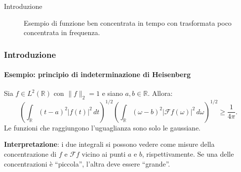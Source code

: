 \documentclass[aspectratio=141]{beamer}
\newcommand{\R}{\mathbb{R}} %
\newcommand{\F}{\mathscr{F}} %
\begin{document}
\begin{section}{Introduzione}
\begin{frame}
\begin{center}
\begin{figure}
{}
			\caption{Esempio di funzione ben concentrata in tempo con trasformata poco concentrata in frequenza.}
			\end{figure}
		\end{center}
	\end{frame}

	\begin{frame}
		\frametitle{Introduzione}
		\framesubtitle{Esempio: principio di indeterminazione di Heisenberg}
		\begin{myblock}
			Sia $f \in L^2(\R)$ con $\|f\|_2 = 1$ e siano $a,b \in \R$. Allora:
			\begin{equation}
				\left(\int_{\R} (t-a)^2 |f(t)|^2 \, dt\right)^{1/2} \left(\int_{\R} (\omega-b)^2 |\F f(\omega)|^2 \, d\omega	\right)^{1/2} \geq \dfrac{1}{4 \pi}.
			\end{equation}
			Le funzioni che raggiungono l'uguaglianza sono solo le gaussiane.
		\end{myblock}
		\textbf{Interpretazione}: i due integrali si possono vedere come misure della concentrazione di $f$ e $\F f$ vicino ai punti $a$ e $b$, rispettivamente. Se una delle concentrazioni è ``piccola'', l'altra deve essere ``grande''.\\
	\end{frame}
	
\end{section}
\end{document}
